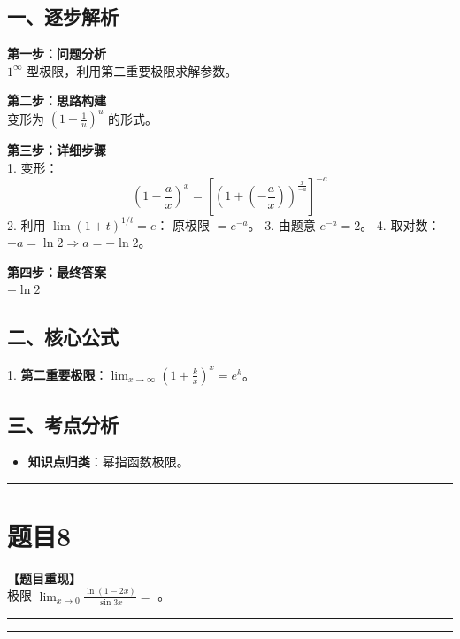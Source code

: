 \documentclass[12pt, a4paper]{ctexart}
\newcommand{\TopSeparator}{
    \par\noindent\rule{\textwidth}{1.5pt}\vspace{0.5em} %
}
\newcommand{\AnalysisSeparator}{
    \par\noindent\rule{\textwidth}{0.5pt}\vspace{0.2em}\hrule\vspace{0.5em} %
}
\newenvironment{RedAnalysis}{
    \par
    \color{red} %
}{
    \par
    \color{black} %
}
\begin{document}
\begin{RedAnalysis}

\subsection*{一、逐步解析}

\textbf{第一步：问题分析} \\
$1^{\infty}$ 型极限，利用第二重要极限求解参数。

\textbf{第二步：思路构建} \\
变形为 $(1 + \frac{1}{u})^u$ 的形式。

\textbf{第三步：详细步骤} \\
1. 变形：
   \[ \left( 1 - \frac{a}{x} \right)^x = \left[ \left( 1 + \left(-\frac{a}{x}\right) \right)^{\frac{x}{-a}} \right]^{-a} \]
2. 利用 $\lim (1+t)^{1/t} = e$：
   原极限 $= e^{-a}$。
3. 由题意 $e^{-a} = 2$。
4. 取对数：$-a = \ln 2 \Rightarrow a = -\ln 2$。

\textbf{第四步：最终答案} \\
$-\ln 2$

\subsection*{二、核心公式}
1. \textbf{第二重要极限}：$\lim_{x\to\infty} (1+\frac{k}{x})^x = e^k$。

\subsection*{三、考点分析}
\begin{itemize}
    \item \textbf{知识点归类}：幂指函数极限。
\end{itemize}

\end{RedAnalysis}

\vspace{2em}

\TopSeparator
\section*{题目8}

\textbf{【题目重现】} \\
极限 $ \lim_{x \to 0} \frac{\ln(1-2x)}{\sin 3x} = $ \underline{\hspace{2cm}}。

\AnalysisSeparator
\end{document}
